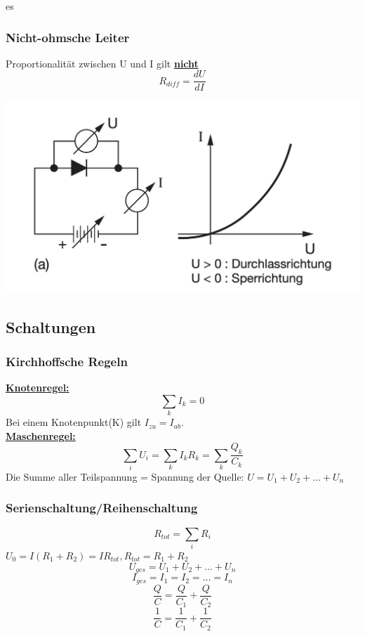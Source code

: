 es\documentclass[a4paper, fontsize=8pt, landscape]{scrartcl}
\newcommand{\hl}[1]{\underline{\textbf{#1}}}
\begin{document}
\begin{multicols*}{4}
\subsubsection{Nicht-ohmsche Leiter}
Proportionalität zwischen U und I gilt \hl{nicht}
\[R_{diff} = \frac{dU}{dI}\]
\begin{center}
    \includegraphics[scale=0.1]{Images/Ohmscheleiter.png}
\end{center}

\subsection{Schaltungen}
\subsubsection{Kirchhoffsche Regeln}
\hl{Knotenregel:}
\[\sum_k I_k = 0\]
Bei einem Knotenpunkt(K) gilt $I_{zu} = I_{ab}$. \\
\hl{Maschenregel:}
\[\sum_i U_i = \sum_k I_k R_k = \sum_k \frac{Q_k}{C_k}\]
Die Summe aller Teilspannung = Spannung der Quelle: $U = U_1 + U_2 + \dots + U_n$


\subsubsection{Serienschaltung/Reihenschaltung}
\[R_{tot} = \sum_i R_i\]
$U_0 = I(R_1 + R_2) = IR_{tot}, R_{tot} = R_1 + R_2$
\[U_{ges} = U_1 + U_2 + \dots + U_n\]
\[I_{ges} = I_1 = I_2 = \dots = I_n\]
\[\frac{Q}{C} = \frac{Q}{C_1}+\frac{Q}{C_2}\]
\[\frac{1}{C} = \frac{1}{C_1} + \frac{1}{C_2}\]


\end{multicols*}
\end{document}
